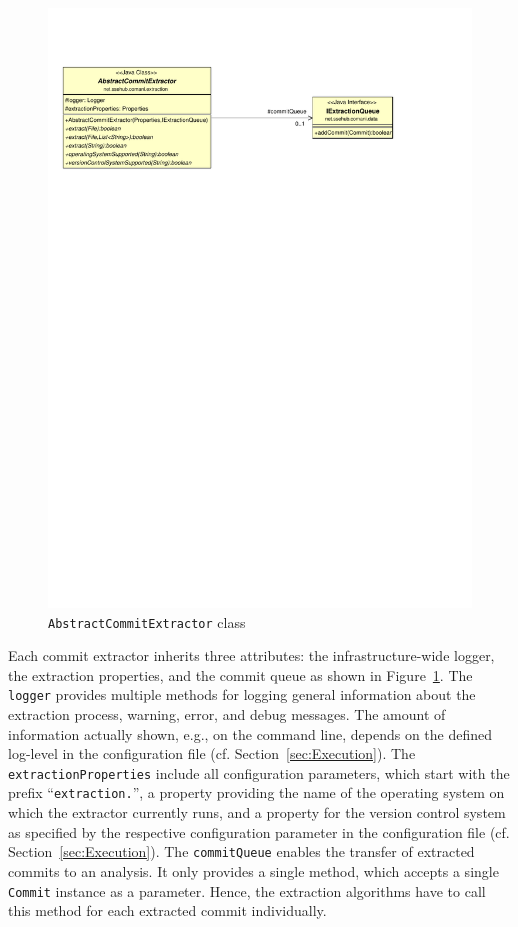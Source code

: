 \begin{figure}[ht] %
	\centering
		\includegraphics[width=\columnwidth,trim={0,7cm 21,7cm 3,9cm 2,9cm},clip]{inserts/comani_abstract_commit_extractor.pdf}
  \caption{\thetool{} \texttt{AbstractCommitExtractor} class}
	\label{fig:AbstractCommitExtractorClass}
\end{figure}

Each commit extractor inherits three attributes: the infrastructure-wide logger, the extraction properties, and the commit queue as shown in Figure~\ref{fig:AbstractCommitExtractorClass}. The \texttt{logger} provides multiple methods for logging general information about the extraction process, warning, error, and debug messages. The amount of information actually shown, e.g., on the command line, depends on the defined log-level in the configuration file (cf. Section~\ref{sec:Execution}). The \texttt{extractionProperties} include all configuration parameters, which start with the prefix ``\texttt{extraction.}'', a property providing the name of the operating system on which the extractor currently runs, and a property for the version control system as specified by the respective configuration parameter in the configuration file (cf. Section~\ref{sec:Execution}). The \texttt{commitQueue} enables the transfer of extracted commits to an analysis. It only provides a single method, which accepts a single \texttt{Commit} instance as a parameter. Hence, the extraction algorithms have to call this method for each extracted commit individually.

